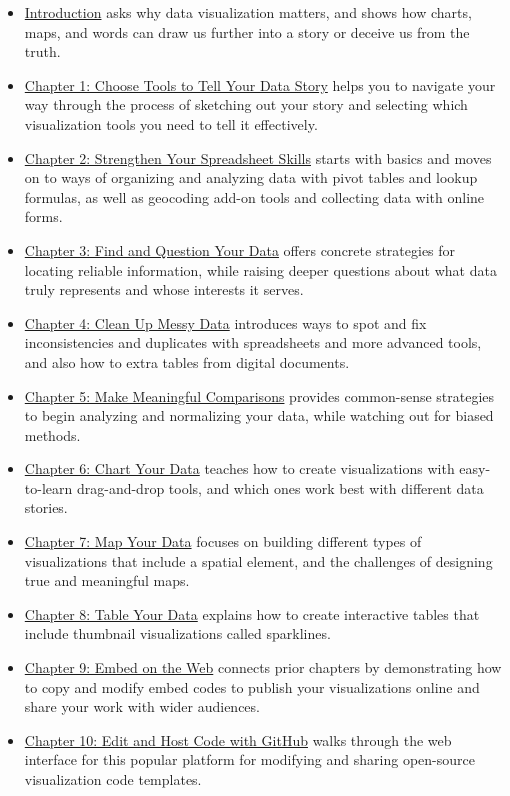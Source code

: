 \documentclass[
  english,
]{book}
\begin{document}
\begin{itemize}
\item
  \href{introduction.html}{Introduction} asks why data visualization matters, and shows how charts, maps, and words can draw us further into a story or deceive us from the truth.
\item
  \href{choose.html}{Chapter 1: Choose Tools to Tell Your Data Story} helps you to navigate your way through the process of sketching out your story and selecting which visualization tools you need to tell it effectively.
\item
  \href{spreadsheet.html}{Chapter 2: Strengthen Your Spreadsheet Skills} starts with basics and moves on to ways of organizing and analyzing data with pivot tables and lookup formulas, as well as geocoding add-on tools and collecting data with online forms.
\item
  \href{find.html}{Chapter 3: Find and Question Your Data} offers concrete strategies for locating reliable information, while raising deeper questions about what data truly represents and whose interests it serves.
\item
  \href{clean.html}{Chapter 4: Clean Up Messy Data} introduces ways to spot and fix inconsistencies and duplicates with spreadsheets and more advanced tools, and also how to extra tables from digital documents.
\item
  \href{comparisons.html}{Chapter 5: Make Meaningful Comparisons} provides common-sense strategies to begin analyzing and normalizing your data, while watching out for biased methods.
\item
  \href{chart.html}{Chapter 6: Chart Your Data} teaches how to create visualizations with easy-to-learn drag-and-drop tools, and which ones work best with different data stories.
\item
  \href{map.html}{Chapter 7: Map Your Data} focuses on building different types of visualizations that include a spatial element, and the challenges of designing true and meaningful maps.
\item
  \href{table.html}{Chapter 8: Table Your Data} explains how to create interactive tables that include thumbnail visualizations called sparklines.
\item
  \href{embed.html}{Chapter 9: Embed on the Web} connects prior chapters by demonstrating how to copy and modify embed codes to publish your visualizations online and share your work with wider audiences.
\item
  \href{github.html}{Chapter 10: Edit and Host Code with GitHub} walks through the web interface for this popular platform for modifying and sharing open-source visualization code templates.

\end{itemize}
\end{document}
